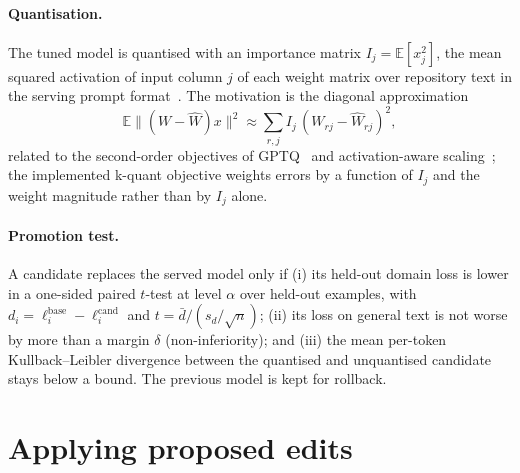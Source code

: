 \documentclass[10pt,twocolumn]{article}
\theoremstyle{definition}
\theoremstyle{remark}
\begin{document}
\paragraph{Quantisation.}
The tuned model is quantised with an importance matrix $I_j=\mathbb E[x_j^2]$, the mean squared activation of input column $j$ of each weight matrix over repository text in the serving prompt format~\cite{kawrakow2024imatrix}.
The motivation is the diagonal approximation
\begin{equation}
\mathbb E\bigl\|(W-\hat W)x\bigr\|^2\approx\sum_{r,j}I_j\,(W_{rj}-\hat W_{rj})^2,
\end{equation}
related to the second-order objectives of GPTQ~\cite{frantar2023gptq} and activation-aware scaling~\cite{lin2024awq}; the implemented k-quant objective weights errors by a function of $I_j$ and the weight magnitude rather than by $I_j$ alone.

\paragraph{Promotion test.}
A candidate replaces the served model only if (i) its held-out domain loss is lower in a one-sided paired $t$-test at level $\alpha$ over held-out examples, with $d_i=\ell^{\mathrm{base}}_i-\ell^{\mathrm{cand}}_i$ and $t=\bar d/(s_d/\sqrt n)$;
(ii) its loss on general text is not worse by more than a margin $\delta$ (non-inferiority);
and (iii) the mean per-token Kullback--Leibler divergence between the quantised and unquantised candidate stays below a bound.
The previous model is kept for rollback.

\section{Applying proposed edits}\label{sec:edit}
\end{document}
